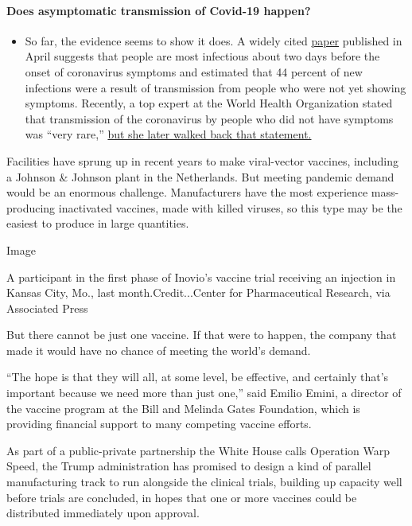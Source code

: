 \begin{itemize}
{  \paragraph{Does asymptomatic transmission of Covid-19
  happen?}\label{does-asymptomatic-transmission-of-covid-19-happen}}

  \begin{itemize}
  \tightlist
  \item
    So far, the evidence seems to show it does. A widely cited
    \href{https://www.nature.com/articles/s41591-020-0869-5}{paper}
    published in April suggests that people are most infectious about
    two days before the onset of coronavirus symptoms and estimated that
    44 percent of new infections were a result of transmission from
    people who were not yet showing symptoms. Recently, a top expert at
    the World Health Organization stated that transmission of the
    coronavirus by people who did not have symptoms was ``very rare,''
    \href{https://www.nytimes.com/2020/06/09/world/coronavirus-updates.html?action=click\&pgtype=Article\&state=default\&region=MAIN_CONTENT_3\&context=storylines_faq\#link-1f302e21}{but
    she later walked back that statement.}
  \end{itemize}
\end{itemize}

Facilities have sprung up in recent years to make viral-vector vaccines,
including a Johnson \& Johnson plant in the Netherlands. But meeting
pandemic demand would be an enormous challenge. Manufacturers have the
most experience mass-producing inactivated vaccines, made with killed
viruses, so this type may be the easiest to produce in large quantities.

Image

A participant in the first phase of Inovio's vaccine trial receiving an
injection in Kansas City, Mo., last month.Credit...Center for
Pharmaceutical Research, via Associated Press

But there cannot be just one vaccine. If that were to happen, the
company that made it would have no chance of meeting the world's demand.

``The hope is that they will all, at some level, be effective, and
certainly that's important because we need more than just one,'' said
Emilio Emini, a director of the vaccine program at the Bill and Melinda
Gates Foundation, which is providing financial support to many competing
vaccine efforts.

As part of a public-private partnership the White House calls Operation
Warp Speed, the Trump administration has promised to design a kind of
parallel manufacturing track to run alongside the clinical trials,
building up capacity well before trials are concluded, in hopes that one
or more vaccines could be distributed immediately upon approval.

